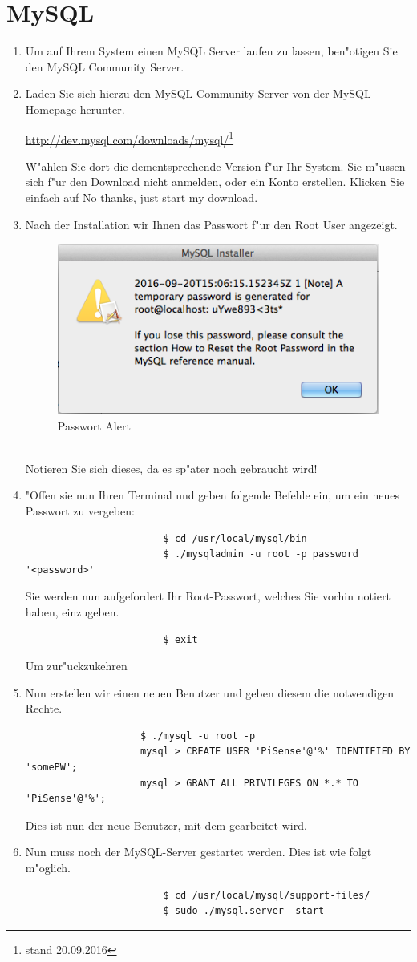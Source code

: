 \documentclass[oneside, a4paper, 11pt]{report}
\begin{document}
		\section{MySQL}
			\begin{enumerate}
				\item[] 
					Um auf Ihrem System einen MySQL Server laufen zu lassen, ben"otigen Sie den \glqq{}MySQL Community Server\grqq{}.
				\item 
					Laden Sie sich hierzu den MySQL Community Server von der MySQL Homepage herunter.
						\begin{center}
							\url{http://dev.mysql.com/downloads/mysql/}\footnote{stand 20.09.2016}
						\end{center}
					W"ahlen Sie dort die dementsprechende Version f"ur Ihr System. Sie m"ussen sich f"ur den Download nicht anmelden, oder ein Konto erstellen. Klicken Sie einfach auf \glqq{}No thanks, just start my download\grqq{}. 
				\item
					Nach der Installation wir Ihnen das Passwort f"ur den Root User angezeigt.
					\begin{figure}[h!]
						\centering
						\includegraphics[width=0.4\linewidth]{img/rootPW.png}
						\caption{Passwort Alert \label{pw_alrt}}
					\end{figure}\\
					Notieren Sie sich dieses, da es sp"ater noch gebraucht wird!
				\item 
					"Offen sie nun Ihren Terminal und geben folgende Befehle ein, um ein neues Passwort zu vergeben:
					\begin{verbatim}
						$ cd /usr/local/mysql/bin
						$ ./mysqladmin -u root -p password '<password>'
					\end{verbatim}
					Sie werden nun aufgefordert Ihr Root-Passwort, welches Sie vorhin notiert haben, einzugeben.
					\begin{verbatim}
						$ exit
					\end{verbatim}
					Um zur"uckzukehren
				\newpage
				\item
					Nun erstellen wir einen neuen Benutzer und geben diesem die notwendigen Rechte.
					\begin{verbatim}
					$ ./mysql -u root -p
					mysql > CREATE USER 'PiSense'@'%' IDENTIFIED BY 'somePW';
					mysql > GRANT ALL PRIVILEGES ON *.* TO 'PiSense'@'%';
					\end{verbatim}
					Dies ist nun der neue Benutzer, mit dem gearbeitet wird.
				\item
					Nun muss noch der MySQL-Server gestartet werden. Dies ist wie folgt m"oglich.
					\begin{verbatim}
						$ cd /usr/local/mysql/support-files/
						$ sudo ./mysql.server  start
					\end{verbatim}
			\end{enumerate}
\end{document}
